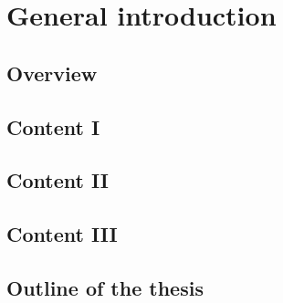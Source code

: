 \chapter{General introduction}

\clearpage
\section{Overview}
\lipsum[1-1] 
\cite{Lakatos1970}

\section{Content I}
\lipsum[1-2]

\section{Content II}
\lipsum[1-3]

\section{Content III}
\lipsum[1-4]

\section{Outline of the thesis}
\lipsum[1-5]

\clearpage
\printbibliography[heading=subbibliography]